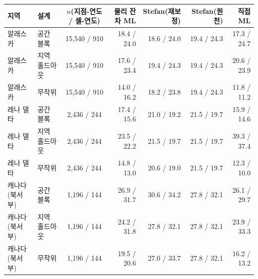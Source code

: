 \setlength{\tabcolsep}{3.5pt}\begin{tabular}{@{}llcrrrr@{}}
\toprule
지역 & 설계 & $n$(지점-연도 / 셀-연도) & 물리 잔차 ML & Stefan(재보정) & Stefan(원천) & 직접 ML \\
\midrule
알래스카 & 공간 블록 & 15,540 / 910 & 18.4 / 24.0 & 18.6 / 24.0 & 19.4 / 24.3 & 17.3 / 24.7 \\
알래스카 & 지역 홀드아웃 & 15,540 / 910 & 17.6 / 23.4 & 19.4 / 24.3 & 19.4 / 24.3 & 20.6 / 23.9 \\
알래스카 & 무작위 & 15,540 / 910 & 14.0 / 16.2 & 18.2 / 23.8 & 19.4 / 24.3 & 11.8 / 11.2 \\
레나 델타 & 공간 블록 & 2,436 / 244 & 17.4 / 15.6 & 21.0 / 19.2 & 21.5 / 19.7 & 15.9 / 14.6 \\
레나 델타 & 지역 홀드아웃 & 2,436 / 244 & 23.5 / 22.2 & 21.5 / 19.7 & 21.5 / 19.7 & 39.3 / 37.4 \\
레나 델타 & 무작위 & 2,436 / 244 & 14.8 / 13.0 & 20.6 / 19.0 & 21.5 / 19.7 & 12.3 / 10.0 \\
캐나다(북서부) & 공간 블록 & 1,196 / 144 & 26.9 / 31.7 & 30.6 / 34.2 & 27.8 / 32.1 & 26.1 / 29.7 \\
캐나다(북서부) & 지역 홀드아웃 & 1,196 / 144 & 24.2 / 31.8 & 27.8 / 32.1 & 27.8 / 32.1 & 23.9 / 33.3 \\
캐나다(북서부) & 무작위 & 1,196 / 144 & 19.5 / 20.6 & 27.0 / 33.7 & 27.8 / 32.1 & 16.2 / 13.2 \\
\bottomrule
\end{tabular}
